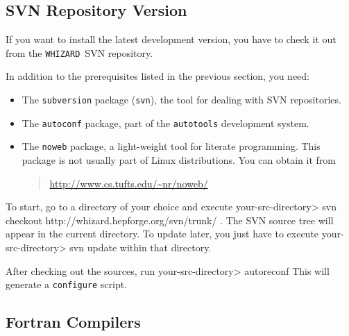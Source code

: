 \documentclass[12pt]{book}
\newenvironment{interaction}%
  {\begingroup\small
   \verbatim}%
  {\endverbatim
   \endgroup\noindent}
\newcommand{\ttt}[1]{\texttt{#1}}
\newcommand{\whizard}{\texttt{WHIZARD}}
\begin{document}
\subsection{SVN Repository Version}

If you want to install the latest development version, you have to
check it out from the \whizard\ SVN repository.

In addition to the prerequisites listed in the previous section, you
need:
\begin{itemize}
\item
  The \ttt{subversion} package (\ttt{svn}), the tool for dealing with
  SVN repositories.
\item
  The \ttt{autoconf} package, part of the \ttt{autotools} development
  system.
\item
  The \ttt{noweb} package, a light-weight tool for literate programming.  This
  package is not usually part of Linux distributions.  You can obtain
  it from
  \begin{quote}
    \url{http://www.cs.tufts.edu/~nr/noweb/}
  \end{quote}
\end{itemize}
To start, go to a directory of your choice and execute
\begin{interaction}
  your-src-directory> svn checkout http://whizard.hepforge.org/svn/trunk/ .
\end{interaction}
The SVN source tree will appear in the current directory.  To update
later, you just have to execute
\begin{interaction}
  your-src-directory> svn update
\end{interaction}
within that directory.

After checking out the sources, run
\begin{interaction}
  your-src-directory> autoreconf
\end{interaction}
This will generate a \ttt{configure} script.


\subsection{\label{sec:compilers}Fortran Compilers}
\end{document}
